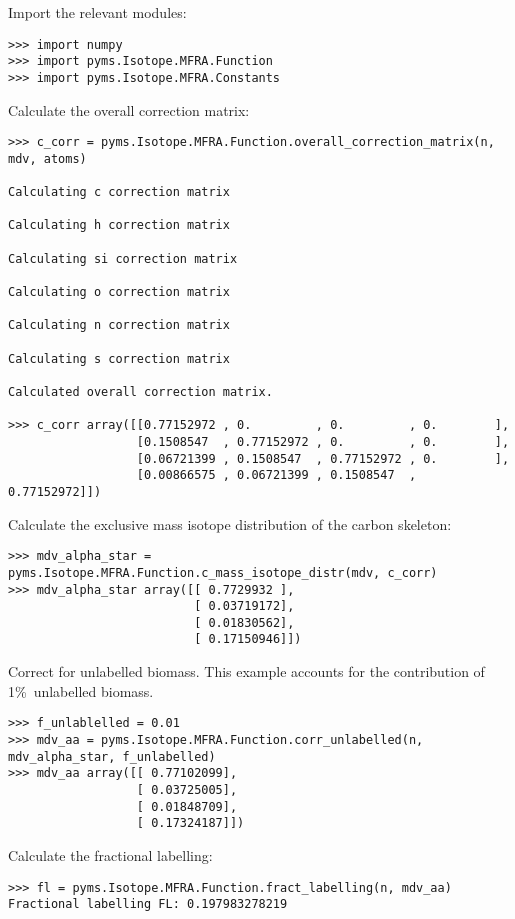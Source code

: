 Import the relevant modules:

\begin{verbatim}
>>> import numpy 
>>> import pyms.Isotope.MFRA.Function 
>>> import pyms.Isotope.MFRA.Constants
\end{verbatim}

Calculate the overall correction matrix:

\begin{verbatim}
>>> c_corr = pyms.Isotope.MFRA.Function.overall_correction_matrix(n, mdv, atoms)

Calculating c correction matrix 

Calculating h correction matrix 

Calculating si correction matrix 

Calculating o correction matrix 

Calculating n correction matrix 

Calculating s correction matrix 

Calculated overall correction matrix.

>>> c_corr array([[0.77152972 , 0.         , 0.         , 0.        ],
                  [0.1508547  , 0.77152972 , 0.         , 0.        ],        
                  [0.06721399 , 0.1508547  , 0.77152972 , 0.        ],
                  [0.00866575 , 0.06721399 , 0.1508547  , 0.77152972]])
\end{verbatim}

Calculate the exclusive mass isotope distribution of the carbon skeleton:

\begin{verbatim}
>>> mdv_alpha_star = pyms.Isotope.MFRA.Function.c_mass_isotope_distr(mdv, c_corr) 
>>> mdv_alpha_star array([[ 0.7729932 ],        
                          [ 0.03719172],        
                          [ 0.01830562],        
                          [ 0.17150946]])
\end{verbatim}

Correct for unlabelled biomass. This example accounts for the contribution
of 1\%\ unlabelled biomass.

\begin{verbatim}
>>> f_unlablelled = 0.01 
>>> mdv_aa = pyms.Isotope.MFRA.Function.corr_unlabelled(n, mdv_alpha_star, f_unlabelled) 
>>> mdv_aa array([[ 0.77102099],        
                  [ 0.03725005],        
                  [ 0.01848709],        
                  [ 0.17324187]])
\end{verbatim}

Calculate the fractional labelling:

\begin{verbatim}
>>> fl = pyms.Isotope.MFRA.Function.fract_labelling(n, mdv_aa) 
Fractional labelling FL: 0.197983278219
\end{verbatim}
